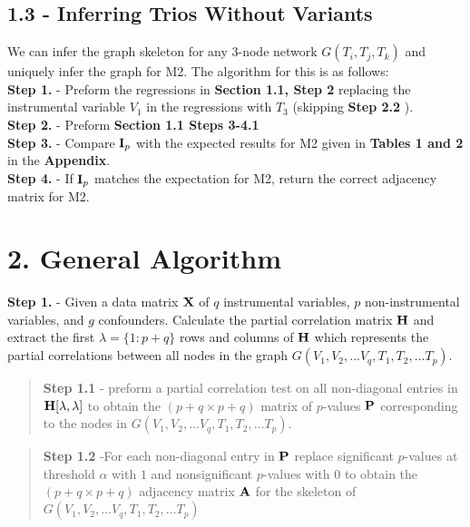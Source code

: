 \documentclass[12pt]{report}
\begin{document}
\subsection*{1.3 - Inferring Trios Without Variants} 
We can infer the graph skeleton for any 3-node network $G(T_i, T_j, T_k)$ and uniquely infer the graph for M2. The algorithm for this is as follows:\\

\noindent \textbf{Step 1.} - Preform the regressions in \textbf{Section 1.1, Step 2} replacing the instrumental variable $V_1$ in the regressions with $T_3$  (skipping \textbf{Step 2.2} ).\\

\noindent\textbf{Step 2.} - Preform \textbf{ Section 1.1 Steps 3-4.1}\\

\noindent\textbf{Step 3.} - Compare ${\bf I}_p$ with the expected results for M2 given in \textbf{Tables 1 and 2} in the \textbf{Appendix}. \\

\noindent\textbf{Step 4.} - If ${\bf I}_p$ matches the expectation for M2, return the correct adjacency matrix for M2.\\


\section*{2. General Algorithm}

\textbf{Step 1.} - Given a data matrix ${\bf X}$ of $q$ instrumental variables, $p$ non-instrumental variables, and $g$ confounders. Calculate the partial correlation matrix $\bf H$ and extract the first $\lambda = \{1 : p+q\}$ rows and columns of ${\bf H}$ which represents the partial correlations between all nodes in the graph $G(V_1, V_2,...V_q, T_1, T_2, ... T_p)$.

\begin{quote}
\textbf{Step 1.1} - preform a partial correlation test on all non-diagonal entries in ${\bf H}[\lambda, \lambda]$ to obtain the $(p+q \times p+q)$ matrix of $p$-values ${\bf P}$ corresponding to the nodes in  $G(V_1, V_2,...V_q, T_1, T_2, ... T_p)$. 
\end{quote}

\begin{quote}
\textbf{Step 1.2} -For each non-diagonal entry in $\bf P$ replace significant $p$-values at threshold $\alpha$ with $1$ and nonsignificant $p$-values with $0$ to obtain the $(p+q \times p+q)$ adjacency matrix $\bf A$ for the skeleton of $G(V_1, V_2,...V_q, T_1, T_2, ... T_p)$
\end{quote}
\end{document}
